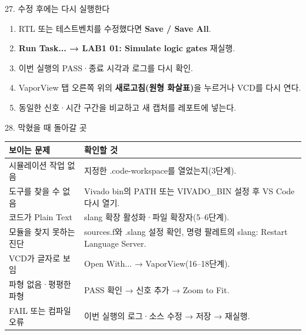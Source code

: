 \begin{frame}{27. 수정 후에는 다시 실행한다}
\small
\begin{enumerate}
\setlength{\itemsep}{0.23cm}
\item RTL 또는 테스트벤치를 수정했다면 \textbf{Save / Save All}.
\item \textbf{Run Task... → LAB1 01: Simulate logic gates} 재실행.
\item 이번 실행의 PASS·종료 시각과 로그를 다시 확인.
\item VaporView 탭 오른쪽 위의 \textbf{새로고침(원형 화살표)}을 누르거나 VCD를 다시 연다.
\item 동일한 신호·시간 구간을 비교하고 새 캡처를 레포트에 넣는다.
\end{enumerate}
\end{frame}

\begin{frame}{28. 막혔을 때 돌아갈 곳}
\small\renewcommand{\arraystretch}{1.35}
\begin{tabular}{@{}p{3.5cm}p{6.8cm}@{}}
\textbf{보이는 문제} & \textbf{확인할 것}\\\hline
시뮬레이션 작업 없음 & 지정한 .code-workspace를 열었는지(3단계).\\
도구를 찾을 수 없음 & Vivado bin의 PATH 또는 VIVADO\_BIN 설정 후 VS Code 다시 열기.\\
코드가 Plain Text & slang 확장 활성화·파일 확장자(5--6단계).\\
모듈을 찾지 못하는 진단 & sources.f와 .slang 설정 확인, 명령 팔레트의 slang: Restart Language Server.\\
VCD가 글자로 보임 & Open With... → VaporView(16--18단계).\\
파형 없음·평평한 파형 & PASS 확인 → 신호 추가 → Zoom to Fit.\\
FAIL 또는 컴파일 오류 & 이번 실행의 로그·소스 수정 → 저장 → 재실행.
\end{tabular}
\end{frame}

